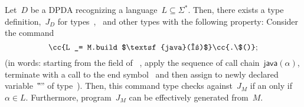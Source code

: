 \begin{theorem}\label{Theorem:Gil-Levy}
  Let~$D$ be a DPDA recognizing a language~$L⊆Σ^*$.
  Then, there exists a \Java type definition,~$J_D$ for types~,~ and other types with the following
  property: Consider the \Java command
  \[
    \cc{L _= M.build $\textsf{java}(α)$}\cc{.\$()};
  \]
  (in words: starting from the  field of ~,
  apply the sequence of call chain~$\textsf{java}(α)$, terminate with a call to the
  end symbol~\cc{\$()} and then assign to newly declared variable~‟\cc{\_}” of type~).
  Then, this command type checks against~$J_M$ if an only if~$α∈L$.
  Furthermore, program~$J_M$ can be effectively generated from~$M$.
\end{theorem}
